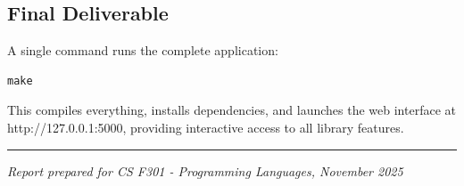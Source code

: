 \documentclass[11pt,a4paper]{article}
\begin{document}
\subsection{Final Deliverable}

A single command runs the complete application:

\begin{verbatim}
make
\end{verbatim}

This compiles everything, installs dependencies, and launches the web interface at http://127.0.0.1:5000, providing interactive access to all library features.

\vspace{1cm}
\begin{center}
\rule{0.5\textwidth}{0.4pt}

\textit{Report prepared for CS F301 - Programming Languages, November 2025}
\end{center}
\end{document}
